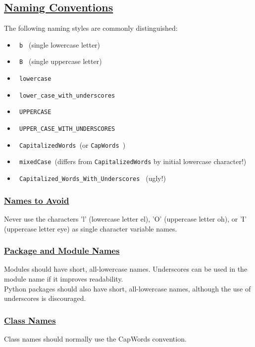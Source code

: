 \documentclass[a4paper]{report}
\begin{document}
\subsection{\href{https://www.python.org/dev/peps/pep-0008/\#naming-conventions}{Naming Conventions}}
The following naming styles are commonly distinguished:
\begin{itemize}
\item \verb| b | (single lowercase letter)
\item \verb| B | (single uppercase letter)
\item \verb| lowercase |
\item \verb| lower_case_with_underscores |
\item \verb| UPPERCASE |
\item \verb| UPPER_CASE_WITH_UNDERSCORES |
\item \verb| CapitalizedWords |(or \verb|CapWords |)
\item \verb| mixedCase |(differs from \verb|CapitalizedWords| by initial lowercase character!)
\item \verb| Capitalized_Words_With_Underscores | (ugly!)
\end{itemize}

\subsubsection{\href{https://www.python.org/dev/peps/pep-0008/\#names-to-avoid}{Names to Avoid}}
Never use the characters 'l' (lowercase letter el), 'O' (uppercase letter oh), or 'I' (uppercase letter eye) as single character variable names.

\subsubsection{\href{https://www.python.org/dev/peps/pep-0008/\#package-and-module-names}{Package and Module Names}}
Modules should have short, all-lowercase names. Underscores can be used in the module name if it improves readability. \\
Python packages should also have short, all-lowercase names, although the use of underscores is discouraged.

\subsubsection{\href{https://www.python.org/dev/peps/pep-0008/\#class-names}{Class Names}}
Class names should normally use the CapWords convention.
\end{document}
